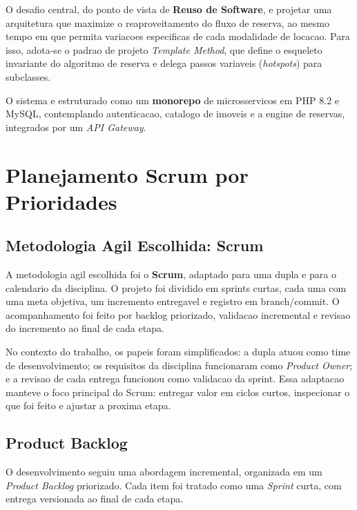 \documentclass[12pt,a4paper]{article}
\begin{document}
O desafio central, do ponto de vista de \textbf{Reuso de Software}, e projetar uma
arquitetura que maximize o reaproveitamento do fluxo de reserva, ao mesmo tempo em que
permita variacoes especificas de cada modalidade de locacao. Para isso, adota-se o
padrao de projeto \textit{Template Method}, que define o esqueleto invariante do
algoritmo de reserva e delega passos variaveis (\textit{hotspots}) para subclasses.

O sistema e estruturado como um \textbf{monorepo} de microsservicos em PHP 8.2 e MySQL,
contemplando autenticacao, catalogo de imoveis e a engine de reservas, integrados por
um \textit{API Gateway}.

\section{Planejamento Scrum por Prioridades}
\subsection{Metodologia Agil Escolhida: Scrum}
A metodologia agil escolhida foi o \textbf{Scrum}, adaptado para uma dupla e para o
calendario da disciplina. O projeto foi dividido em sprints curtas, cada uma com uma
meta objetiva, um incremento entregavel e registro em branch/commit. O acompanhamento
foi feito por backlog priorizado, validacao incremental e revisao do incremento ao
final de cada etapa.

No contexto do trabalho, os papeis foram simplificados: a dupla atuou como time de
desenvolvimento; os requisitos da disciplina funcionaram como \textit{Product Owner};
e a revisao de cada entrega funcionou como validacao da sprint. Essa adaptacao manteve
o foco principal do Scrum: entregar valor em ciclos curtos, inspecionar o que foi feito
e ajustar a proxima etapa.

\subsection{Product Backlog}
O desenvolvimento seguiu uma abordagem incremental, organizada em um
\textit{Product Backlog} priorizado. Cada item foi tratado como uma \textit{Sprint}
curta, com entrega versionada ao final de cada etapa.
\end{document}
